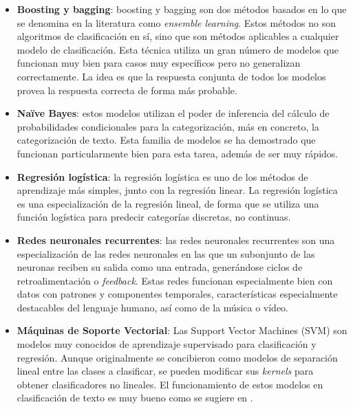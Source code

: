 \begin{itemize}
    \item \textbf{Boosting y bagging}: boosting y bagging son dos métodos basados en lo que se denomina en la literatura como \textit{ensemble learning}. Estos métodos no son algoritmos de clasificación en sí, sino que son métodos aplicables a cualquier modelo de clasificación. Esta técnica utiliza un gran número de modelos que funcionan muy bien para casos muy específicos pero no generalizan correctamente. La idea es que la respuesta conjunta de todos los modelos provea la respuesta correcta de forma más probable. \cite{Bauer2004AnEC}
    
    \item \textbf{Naïve Bayes}: estos modelos utilizan el poder de inferencia del cálculo de probabilidades condicionales para la categorización, más en concreto, la categorización de texto. Esta familia de modelos se ha demostrado que funcionan particularmente bien para esta tarea, además de ser muy rápidos. \cite{FrankNaive2006}

    \item \textbf{Regresión logística}: la regresión logística es uno de los métodos de aprendizaje más simples, junto con la regresión linear. La regresión logística es una especialización de la regresión lineal, de forma que se utiliza una función logística para predecir categorías discretas, no continuas. \cite{logitText}

    \item \textbf{Redes neuronales recurrentes}: las redes neuronales recurrentes son una especialización de las redes neuronales en las que un subonjunto de las neuronas reciben su salida como una entrada, generándose ciclos de retroalimentación o \textit{feedback}. Estas redes funcionan especialmente bien con datos con patrones y componentes temporales, características especialmente destacables del lenguaje humano, así como de la música o vídeo. \cite{ZhouLSTM}

    \item \textbf{Máquinas de Soporte Vectorial}: Las Support Vector Machines (SVM) son modelos muy conocidos de aprendizaje supervisado para clasificación y regresión. Aunque originalmente se concibieron como modelos de separación lineal entre las clases a clasificar, se pueden modificar sus \textit{kernels} para obtener clasificadores no lineales. El funcionamiento de estos modelos en clasificación de texto es muy bueno como se sugiere en \cite{SVMJoa1998}.
\end{itemize}


